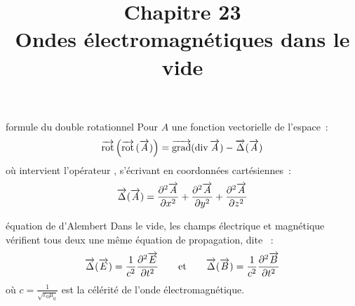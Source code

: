 

\setcounter{chapitre}{23}

\title{\Large Chapitre 23 \\ \Huge Ondes électromagnétiques dans le vide}



\maketitle

\begin{theoreme}{}{formule du double rotationnel}
    Pour $A$ une fonction vectorielle de l'espace~:
    $$\overrightarrow{\mathrm{rot}}\, \Big( \overrightarrow{\mathrm{rot}}\,(\overrightarrow{A}) \Big) = \overrightarrow{\mathrm{grad}}(\mathrm{div}\, \overrightarrow{A} ) - \overrightarrow{\Delta} (\overrightarrow{A})$$
    où intervient l'opérateur , s'écrivant en coordonnées cartésiennes~:
    $$\overrightarrow{\Delta}(\overrightarrow{A}) = \frac{\partial^{2}\overrightarrow{A}}{\partial x^{2}} + \frac{\partial^{2}\overrightarrow{A}}{\partial y^{2}} + \frac{\partial^{2}\overrightarrow{A}}{\partial z^{2}}$$
\end{theoreme}

\begin{theoreme}{}{équation de d'Alembert}
    Dans le vide, les champs électrique et magnétique vérifient tous deux une même équation de propagation, dite ~:
    $$\overrightarrow{\Delta}(\overrightarrow{E}) = \frac{1}{c^2} \frac{\partial^{2}\overrightarrow{E}}{\partial t^{2}} \qquad \mathrm{et} \qquad \overrightarrow{\Delta}(\overrightarrow{B}) = \frac{1}{c^2} \frac{\partial^{2}\overrightarrow{B}}{\partial t^{2}}$$
    où $\displaystyle c = \frac{1}{\sqrt{\varepsilon_0 \mu_0}}$ est la célérité de l'onde électromagnétique.
\end{theoreme}


